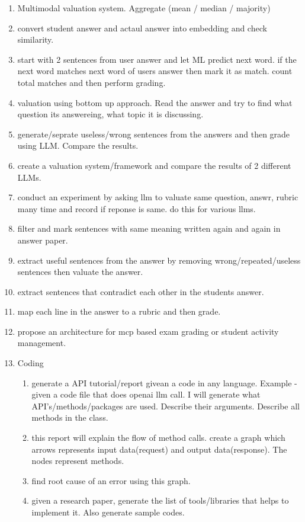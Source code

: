 \begin{enumerate}
        \item Multimodal valuation system. Aggregate (mean / median / majority)
        \item convert student answer and actaul answer into embedding and check similarity.
        \item start with 2 sentences from user answer and let ML predict next word. if the next word matches next word of users answer then mark it as match. count total matches and then perform grading.
        \item valuation using bottom up approach. Read the answer and try to find what question its answereing, what topic it is discussing.
        \item generate/seprate useless/wrong sentences from the answers and then grade using LLM. Compare the results.
        \item create a valuation system/framework and compare the results of 2 different LLMs.
        \item conduct an experiment by asking llm to valuate same question, answr, rubric many time and record if reponse is same. do this for various llms.
        \item filter and mark sentences with same meaning written again and again in answer paper.
        \item extract useful sentences from the answer by removing wrong/repeated/useless sentences then valuate the answer.
        \item extract sentences that contradict each other in the students answer.
        \item map each line in the answer to a rubric and then grade.
        \item propose an architecture for mcp based exam grading or student activity management.
        \item Coding
			\begin{enumerate}
				\item generate a API tutorial/report givean a code in any language. Example - given a code file that does openai llm call. I will generate what API's/methods/packages are used. Describe their arguments. Describe all methods in the class. 
				\item this report will explain the flow of method calls. create a graph which arrows represents input data(request) and output data(response). The nodes represent methods.
				\item find root cause of an error using this graph.
				\item given a research paper, generate the list of tools/libraries that helps to implement it. Also generate sample codes.

\end{enumerate}
\end{enumerate}
